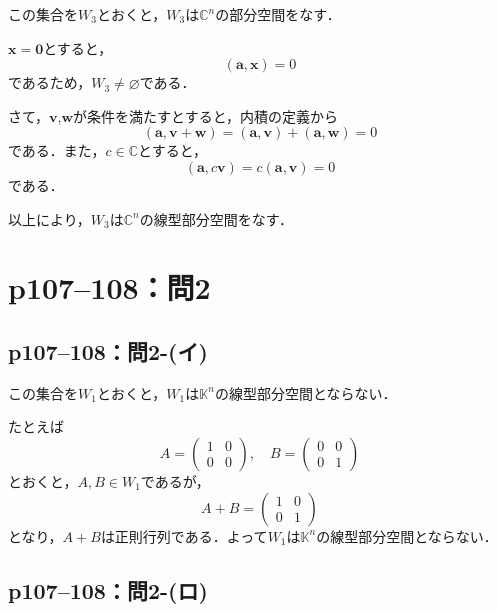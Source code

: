 \documentclass[a4paper,10pt,fleqn]{ltjsarticle}
\begin{document}
\begin{tleftbar}
    この集合を$W_3$とおくと，$W_3$は$\mathbb{C}^n$の部分空間をなす．

    $\bm{x}=\bm{0}$とすると，
    \[
        (\bm{a},\bm{x}) =0
    \]
    であるため，$W_3 \ne \varnothing$である．

    さて，$\bm{v}$,$\bm{w}$が条件を満たすとすると，内積の定義から
    \[
        (\bm{a},\bm{v}+\bm{w})=(\bm{a},\bm{v})+(\bm{a},\bm{w})=0
    \]
    である．また，$ c \in \mathbb{C}$とすると，
    \[
        (\bm{a},c\bm{v})=c(\bm{a},\bm{v})=0
    \]
    である．

    以上により，$W_3$は$\mathbb{C}^n$の線型部分空間をなす．
\end{tleftbar}


\section*{p107--108：問2}


\subsection*{p107--108：問2-(イ)}

\begin{tleftbar}この集合を$W_1$とおくと，$W_1$は$\mathbb{K}^n$の線型部分空間とならない．

    たとえば
    \[
        A = \begin{pmatrix} 1 & 0 \\ 0 & 0 \end{pmatrix},\quad B = \begin{pmatrix} 0 & 0 \\ 0 & 1 \end{pmatrix}
    \]
    とおくと，$ A , B \in W_1$であるが，
    \[
        A + B = \begin{pmatrix} 1 & 0 \\ 0 & 1 \end{pmatrix}
    \]
    となり，$A+B$は正則行列である．よって$W_1$は$\mathbb{K}^n$の線型部分空間とならない．
\end{tleftbar}


\subsection*{p107--108：問2-(ロ)}
\end{document}

